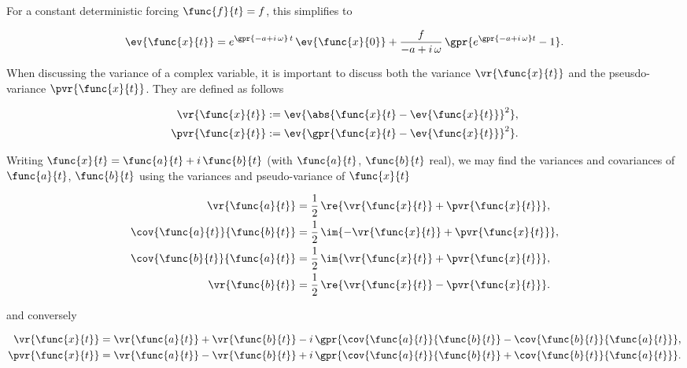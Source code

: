 For a constant deterministic forcing $\func{f}{t} = f$, this simplifies to

\begin{equation}
	\ev{\func{x}{t}} = e^{\gpr{-a + i\,\omega}\,t}\,\ev{\func{x}{0}} + \frac{f}{-a + i\,\omega}\,\gpr{e^{\gpr{-a + i\,\omega}t} - 1}.
\end{equation}

When discussing the variance of a complex variable, it is important to discuss both the variance $\vr{\func{x}{t}}$ and the pseusdo-variance $\pvr{\func{x}{t}}$. They are defined as follows

\begin{subequations}
	\begin{align}
		\vr{\func{x}{t}} &:= \ev{\abs{\func{x}{t} - \ev{\func{x}{t}}}^2}, \\
		\pvr{\func{x}{t}} &:= \ev{\gpr{\func{x}{t} - \ev{\func{x}{t}}}^2}.
	\end{align}
\end{subequations}

Writing $\func{x}{t} = \func{a}{t} + i\,\func{b}{t}$ (with $\func{a}{t}$, $\func{b}{t}$ real), we may find the variances and covariances of $\func{a}{t}$, $\func{b}{t}$ using the variances and pseudo-variance of $\func{x}{t}$

\begin{subequations}
	\begin{align}
		\vr{\func{a}{t}} &= \frac{1}{2}\,\re{\vr{\func{x}{t}} + \pvr{\func{x}{t}}}, \\
		\cov{\func{a}{t}}{\func{b}{t}} &= \frac{1}{2}\,\im{-\vr{\func{x}{t}} + \pvr{\func{x}{t}}}, \\
		\cov{\func{b}{t}}{\func{a}{t}} &= \frac{1}{2}\,\im{\vr{\func{x}{t}} + \pvr{\func{x}{t}}}, \\
		\vr{\func{b}{t}} &= \frac{1}{2}\,\re{\vr{\func{x}{t}} - \pvr{\func{x}{t}}}.
	\end{align}
\end{subequations}

and conversely

\begin{subequations}
	\begin{align}
		\vr{\func{x}{t}} &= \vr{\func{a}{t}} + \vr{\func{b}{t}} - i\,\gpr{\cov{\func{a}{t}}{\func{b}{t}} - \cov{\func{b}{t}}{\func{a}{t}}}, \\
		\pvr{\func{x}{t}} &= \vr{\func{a}{t}} - \vr{\func{b}{t}} + i\,\gpr{\cov{\func{a}{t}}{\func{b}{t}} + \cov{\func{b}{t}}{\func{a}{t}}}.
	\end{align}
\end{subequations}

